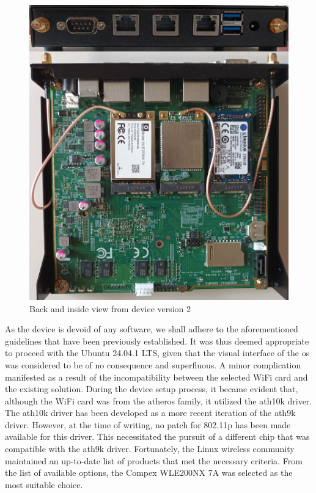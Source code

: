 \begin{figure}
	\centering
	\includegraphics[width=\textwidth]{Chapters/Figures/Implementation/devices/device_1.5.jpg}
	\caption{Back and inside view from device version 2}
	\label{fig:device_2}
\end{figure}


As the device is devoid of any software, we shall adhere to the aforementioned guidelines that have been previously established. It was thus deemed appropriate to proceed with the Ubuntu 24.04.1 LTS, given that the visual interface of the \gls{os} was considered to be of no consequence and superfluous.
A minor complication manifested as a result of the incompatibility between the selected WiFi card and the existing solution. During the device setup process, it became evident that, although the WiFi card was from the atheros family, it utilized the ath10k driver. The ath10k driver has been developed as a more recent iteration of the ath9k driver. However, at the time of writing, no patch for 802.11p has been made available for this driver. This necessitated the pursuit of a different chip that was compatible with the ath9k driver. Fortunately, the Linux wireless community maintained an up-to-date list of products that met the necessary criteria\cite{noauthor_external_nodate}. From the list of available options, the Compex WLE200NX 7A was selected as the most suitable choice.

